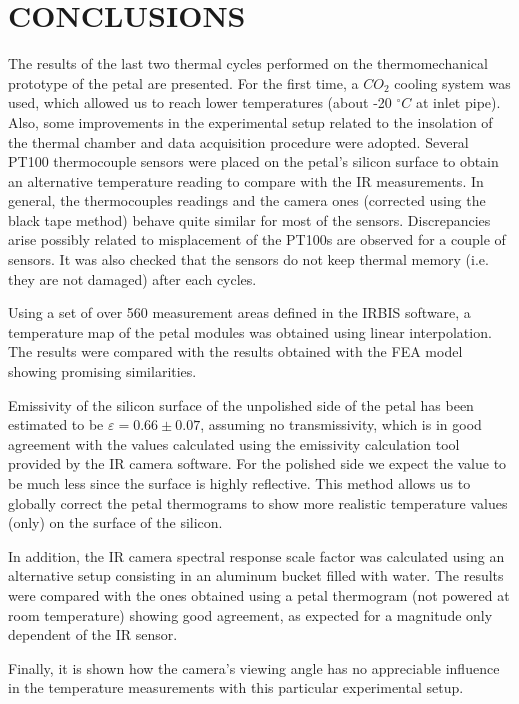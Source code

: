 \pagestyle{conclusions}

\section*{\uppercase{Conclusions}}\label{concl}
	\bigskip
	\bigskip
	The results of the last two thermal cycles performed on the thermomechanical prototype of the petal are presented. For the first time, a $CO_{2}$ cooling system was used, which allowed us to reach lower temperatures (about -20 $^\circ C$ at inlet pipe). Also, some improvements in the experimental setup related to the insolation of the thermal chamber and data acquisition procedure were adopted. Several PT100 thermocouple sensors were placed on the petal’s silicon surface to obtain an alternative temperature reading to compare with the IR measurements. In general, the thermocouples readings and the camera ones (corrected using the black tape method) behave quite similar for most of the sensors. Discrepancies arise possibly related to misplacement of the PT100s are observed for a couple of sensors. It was also checked that the sensors do not keep thermal memory (i.e. they are not damaged) after each cycles.
	
	Using a set of over 560 measurement areas defined in the IRBIS software, a temperature map of the petal modules was obtained using linear interpolation. The results were compared with the results obtained with the FEA model showing promising similarities.
	
	Emissivity of the silicon surface of the unpolished side of the petal has been estimated to be $\varepsilon=0.66 \pm 0.07$, assuming no transmissivity, which is in good agreement with the values calculated using the emissivity calculation tool provided by the IR camera software. For the polished side we expect the value to be much less since the surface is highly reflective. This method allows us to globally correct the petal thermograms to show more realistic temperature values (only) on the surface of the silicon. 
	
	In addition, the IR camera spectral response scale factor was calculated using an alternative setup consisting in an aluminum bucket filled with water. The results were compared with the ones obtained using a petal thermogram (not powered at room temperature) showing good agreement, as expected for a magnitude only dependent of the IR sensor.
	
	Finally, it is shown how the camera’s viewing angle has no appreciable influence in the temperature measurements with this particular experimental setup.
	 
	